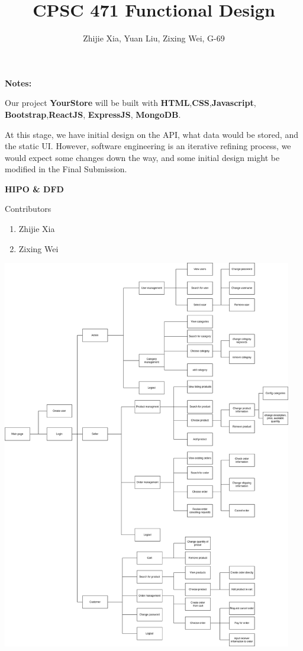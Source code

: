 \documentclass[12pt]{article}
\author{Zhijie Xia, Yuan Liu, Zixing Wei, G-69}
\title{CPSC 471 Functional Design}
\begin{document}
\maketitle

\newpage
\textbf{Notes:\\}

Our project \textbf{YourStore} will be built with \textbf{HTML},\textbf{CSS},\textbf{Javascript}, \textbf{Bootstrap},\textbf{ReactJS},
\textbf{ExpressJS}, \textbf{MongoDB}.



At this stage, we have initial design on the API, what data would be stored, and the static UI. However, software engineering is an iterative refining process,
we would expect some changes down the way, and some initial design might be modified in the Final Submission.



\newpage

\textbf{HIPO \& DFD}

Contributors
\begin{enumerate}
    \item Zhijie Xia
    \item Zixing Wei
\end{enumerate}

\includegraphics[width=0.95\textwidth]{HIPO/HIPO.drawio.png}
\end{document}
